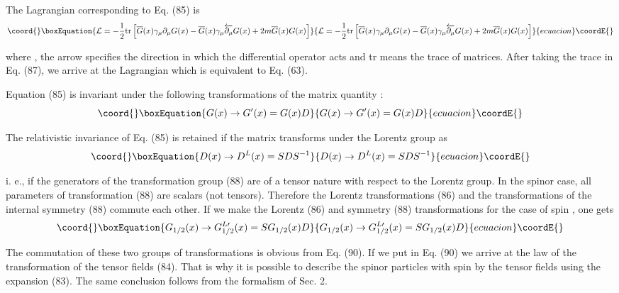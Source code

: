 \documentclass[a4paper,12pt]{article}
\begin{document}
The Lagrangian corresponding to Eq. (85) is
\begin{equation}\coord{}\boxEquation{
\mathcal{L}=-\frac 12\mbox{tr}\left[ \overline{G}(x)\gamma _\mu
\partial _\mu G(x)-\overline{G}(x)\gamma _\mu
\overleftarrow{\partial _\mu }G(x)+2m \overline{G}(x)G(x)\right]
\label{87}
}{
\mathcal{L}=-\frac 12\mbox{tr}\left[ \overline{G}(x)\gamma _\mu
\partial _\mu G(x)-\overline{G}(x)\gamma _\mu
\overleftarrow{\partial _\mu }G(x)+2m \overline{G}(x)G(x)\right]
}{ecuacion}\coordE{}\end{equation}

where \coordHE{}, the arrow specifies the
direction in which the differential operator acts and tr means the trace of
matrices. After taking the trace in Eq. (87), we arrive at the Lagrangian
which is equivalent to Eq. (63).

Equation (85) is invariant under the following transformations of the matrix
quantity \coordHE{}:
\begin{equation}\coord{}\boxEquation{
G(x)\rightarrow G^{\prime }(x)=G(x)D  \label{88}
}{
G(x)\rightarrow G^{\prime }(x)=G(x)D  }{ecuacion}\coordE{}\end{equation}

The relativistic invariance of Eq. (85) is retained if the matrix \coordHE{}
transforms under the Lorentz group as
\begin{equation}\coord{}\boxEquation{
D(x)\rightarrow D^L(x)=SDS^{-1}  \label{89}
}{
D(x)\rightarrow D^L(x)=SDS^{-1}  }{ecuacion}\coordE{}\end{equation}

i. e., if the generators of the transformation group (88) are of a tensor
nature with respect to the Lorentz group. In the spinor case, all parameters
of transformation (88) are scalars (not tensors). Therefore the Lorentz
transformations (86) and the transformations of the internal symmetry (88)
commute each other. If we make the Lorentz (86) and symmetry (88)
transformations for the case of spin \coordHE{}, one gets
\begin{equation}\coord{}\boxEquation{
G_{1/2}(x)\rightarrow G_{1/2}^{L\prime }(x)=SG_{1/2}(x)D  \label{90}
}{
G_{1/2}(x)\rightarrow G_{1/2}^{L\prime }(x)=SG_{1/2}(x)D  }{ecuacion}\coordE{}\end{equation}

The commutation of these two groups of transformations is obvious from Eq.
(90). If we put \coordHE{} in Eq. (90) we arrive at the law of the
transformation of the tensor fields (84). That is why it is possible to
describe the spinor particles with spin \coordHE{} by the tensor fields using the
expansion (83). The same conclusion follows from the formalism of Sec. 2.
\end{document}
